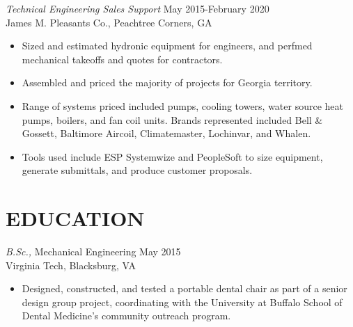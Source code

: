 \documentclass[margin]{res}
\begin{document}
\begin{resume}
    {\sl Technical Engineering Sales Support} \hfill May 2015-February 2020 \\
        James M. Pleasants Co., Peachtree Corners, GA
        \begin{itemize}  \itemsep -2pt %
            \item Sized and estimated hydronic equipment for engineers, and perfmed mechanical takeoffs and quotes for contractors.
            \item Assembled and priced the majority of projects for Georgia territory.
            \item Range of systems priced included pumps, cooling towers, water source heat pumps, boilers, and fan coil units. Brands represented included Bell & Gossett, Baltimore Aircoil, Climatemaster, Lochinvar, and Whalen.
            \item Tools used include ESP Systemwize and PeopleSoft to size equipment, generate submittals, and produce customer proposals.
            \end{itemize}
 

\section{EDUCATION} {\sl B.Sc.,} Mechanical Engineering \hfill  May 2015 \\
    Virginia Tech, Blacksburg, VA
    \begin{itemize}  \itemsep -2pt %
        \item Designed, constructed, and tested a portable dental chair as part of a senior design group project, coordinating with the University at Buffalo School of Dental Medicine's community outreach program.
    \end{itemize}


\end{resume}
\end{document}
